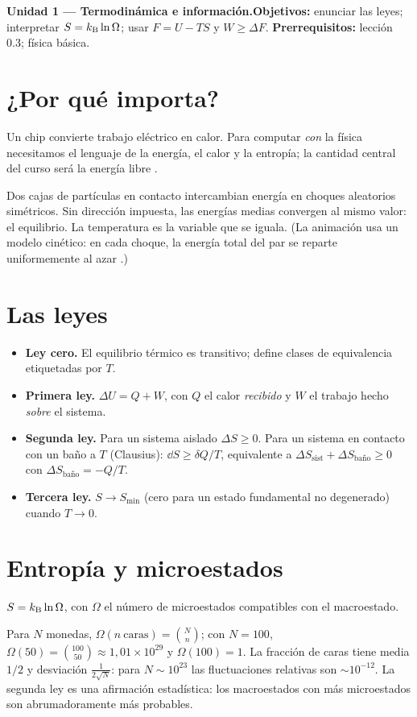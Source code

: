 \documentclass[11pt,a4paper]{article}
\begin{document}

\noindent\textbf{Unidad 1 --- Termodinámica e información.}\quad\textbf{Objetivos:} enunciar las leyes; interpretar
$S=k_{\mathrm B}\ln\Omega$; usar $F=U-TS$ y $W\ge\Delta F$. \textbf{Prerrequisitos:} lección 0.3; física básica.

\section{¿Por qué importa?}
Un chip convierte trabajo eléctrico en calor. Para computar \emph{con} la física necesitamos el lenguaje de
la energía, el calor y la entropía; la cantidad central del curso será la energía libre \cite{peliti}.

\begin{intuicion}
Dos cajas de partículas en contacto intercambian energía en choques aleatorios simétricos. Sin dirección
impuesta, las energías medias convergen al mismo valor: el equilibrio. La temperatura es la variable que se iguala.
(La animación usa un modelo cinético: en cada choque, la energía total del par se reparte uniformemente al azar \evS.)
\end{intuicion}

\section{Las leyes}
\begin{itemize}
\item \textbf{Ley cero.} El equilibrio térmico es transitivo; define clases de equivalencia etiquetadas por $T$.
\item \textbf{Primera ley.} $\Delta U=Q+W$, con $Q$ el calor \emph{recibido} y $W$ el trabajo hecho \emph{sobre} el sistema.
\item \textbf{Segunda ley.} Para un sistema aislado $\Delta S\ge0$. Para un sistema en contacto con un baño a $T$
(Clausius): $\dd S\ge\delta Q/T$, equivalente a $\Delta S_{\text{sist}}+\Delta S_{\text{baño}}\ge0$ con $\Delta S_{\text{baño}}=-Q/T$.
\item \textbf{Tercera ley.} $S\to S_{\min}$ (cero para un estado fundamental no degenerado) cuando $T\to0$.
\end{itemize}

\section{Entropía y microestados}
\begin{definicion}
$S=k_{\mathrm B}\ln\Omega$, con $\Omega$ el número de microestados compatibles con el macroestado.
\end{definicion}
Para $N$ monedas, $\Omega(n\ \text{caras})=\binom Nn$; con $N=100$, $\Omega(50)=\binom{100}{50}\approx1{,}01\times10^{29}$ y
$\Omega(100)=1$. La fracción de caras tiene media $1/2$ y desviación $\frac{1}{2\sqrt N}$: para $N\sim10^{23}$ las
fluctuaciones relativas son $\sim10^{-12}$. La segunda ley es una afirmación estadística: los macroestados con más
microestados son abrumadoramente más probables.
\end{document}
